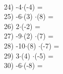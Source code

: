 \documentclass[a4paper,10pt]{article}
\begin{document}
\vspace{0.5cm}\\24)   -4$\cdot$(-4) =
\vspace{0.5cm}\\25)   -6$\cdot$(3) $\cdot$(8) =
\vspace{0.5cm}\\26)   2$\cdot$(-2) =
\vspace{0.5cm}\\27)   -9$\cdot$(2) $\cdot$(7) =
\vspace{0.5cm}\\28)   -10$\cdot$(8) $\cdot$(-7) =
\vspace{0.5cm}\\29)   3$\cdot$(4) $\cdot$(-5) =
\vspace{0.5cm}\\30)   -6$\cdot$(-8) =
\vspace{0.5cm}\\\pagebreak
\end{document}
